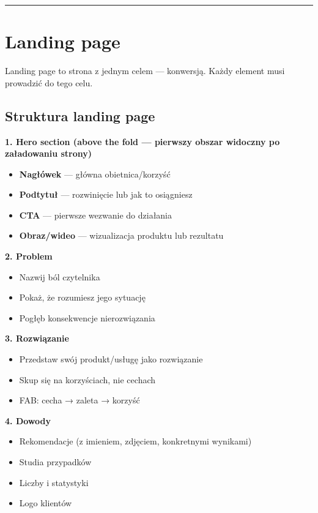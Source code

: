 \documentclass[
  12pt,
  a4paper,
  twoside,
  openright,
  12pt,
  DIV=12,
  BCOR=12mm]{scrbook}
\providecommand{\tightlist}{%
  \setlength{\itemsep}{0pt}\setlength{\parskip}{0pt}}\usepackage{longtable,booktabs,array}
\newcommand{\decoline}{%
  \begin{center}
    \textcolor{bordergray}{\rule{0.3\textwidth}{0.5pt}}
  \end{center}
}
\begin{document}
\decoline

\section{Landing page}\label{landing-page-1}

Landing page to strona z jednym celem --- konwersją. Każdy element musi
prowadzić do tego celu.

\subsection{Struktura landing page}\label{struktura-landing-page}

\textbf{1. Hero section (above the fold --- pierwszy obszar widoczny po
załadowaniu strony)}

\begin{itemize}
\tightlist
\item
  \textbf{Nagłówek} --- główna obietnica/korzyść
\item
  \textbf{Podtytuł} --- rozwinięcie lub jak to osiągniesz
\item
  \textbf{CTA} --- pierwsze wezwanie do działania
\item
  \textbf{Obraz/wideo} --- wizualizacja produktu lub rezultatu
\end{itemize}

\textbf{2. Problem}

\begin{itemize}
\tightlist
\item
  Nazwij ból czytelnika
\item
  Pokaż, że rozumiesz jego sytuację
\item
  Pogłęb konsekwencje nierozwiązania
\end{itemize}

\textbf{3. Rozwiązanie}

\begin{itemize}
\tightlist
\item
  Przedstaw swój produkt/usługę jako rozwiązanie
\item
  Skup się na korzyściach, nie cechach
\item
  FAB: cecha → zaleta → korzyść
\end{itemize}

\textbf{4. Dowody}

\begin{itemize}
\tightlist
\item
  Rekomendacje (z imieniem, zdjęciem, konkretnymi wynikami)
\item
  Studia przypadków
\item
  Liczby i statystyki
\item
  Logo klientów
\end{itemize}
\end{document}
